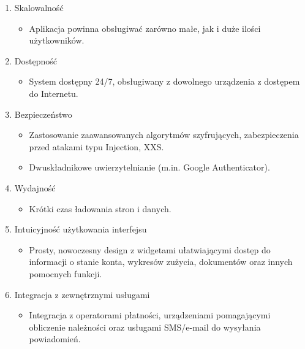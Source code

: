 \begin{enumerate}[label=\arabic*.]
    \item Skalowalność
    \begin{itemize}
        \item Aplikacja powinna obsługiwać zarówno małe, jak i duże ilości użytkowników.
    \end{itemize}
    \item Dostępność
    \begin{itemize}
        \item System dostępny 24/7, obsługiwany z dowolnego urządzenia z dostępem do Internetu.
    \end{itemize}
    \item Bezpieczeństwo
    \begin{itemize}
        \item Zastosowanie zaawansowanych algorytmów szyfrujących, zabezpieczenia przed atakami typu Injection, XXS.
        \item Dwuskładnikowe uwierzytelnianie (m.in. Google Authenticator).
    \end{itemize}
    \item Wydajność
    \begin{itemize}
        \item Krótki czas ładowania stron i danych.
    \end{itemize}
    \item Intuicyjność użytkowania interfejsu
    \begin{itemize}
        \item Prosty, nowoczesny design z widgetami ułatwiającymi dostęp do informacji o stanie konta, wykresów zużycia, dokumentów oraz innych pomocnych funkcji.
    \end{itemize}
    \item Integracja z zewnętrznymi usługami
    \begin{itemize}
        \item Integracja z operatorami płatności, urządzeniami pomagającymi obliczenie należności oraz usługami SMS/e-mail do wysyłania powiadomień.
    \end{itemize}
\end{enumerate}
